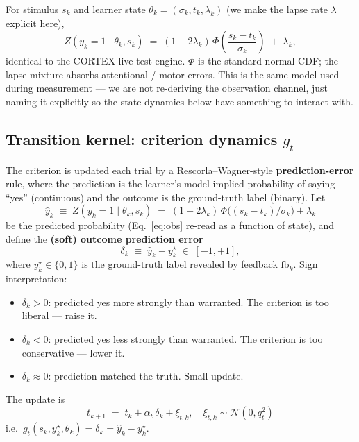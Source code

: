\documentclass[11pt]{article}
\begin{document}
For stimulus $s_k$ and learner state $\theta_k = (\sigma_k, t_k,
\lambda_k)$ (we make the lapse rate $\lambda$ explicit here),
\begin{equation}
  Z(y_k = 1 \mid \theta_k, s_k) \;=\;
    (1 - 2\lambda_k)\,\Phi\!\left(\frac{s_k - t_k}{\sigma_k}\right)
    \;+\; \lambda_k,
  \label{eq:obs}
\end{equation}
identical to the CORTEX live-test engine. $\Phi$ is the standard
normal CDF; the lapse mixture absorbs attentional / motor errors.
This is the same model used during measurement — we are not
re-deriving the observation channel, just naming it explicitly so the
state dynamics below have something to interact with.

\subsection{Transition kernel: criterion dynamics $g_t$}
\label{sec:gt}

The criterion is updated each trial by a Rescorla--Wagner-style
\textbf{prediction-error} rule, where the prediction is the learner's
model-implied probability of saying ``yes'' (continuous) and the
outcome is the ground-truth label (binary). Let
\begin{equation}
  \hat y_k \;\equiv\; Z(y_k = 1 \mid \theta_k, s_k)
  \;=\; (1 - 2\lambda_k)\,\Phi\!\bigl((s_k - t_k)/\sigma_k\bigr) + \lambda_k
  \label{eq:yhat}
\end{equation}
be the predicted probability (Eq.~\ref{eq:obs} re-read as a function
of state), and define the \textbf{(soft) outcome prediction error}
\begin{equation}
  \delta_k \;\equiv\; \hat y_k - y_k^{\star}
  \;\in\; [-1, +1],
  \label{eq:delta}
\end{equation}
where $y_k^{\star} \in \{0, 1\}$ is the ground-truth label revealed
by feedback $\mathrm{fb}_k$. Sign interpretation:
\begin{itemize}[leftmargin=*,itemsep=1pt]
  \item $\delta_k > 0$: predicted yes more strongly than warranted.
        The criterion is too liberal — raise it.
  \item $\delta_k < 0$: predicted yes less strongly than warranted.
        The criterion is too conservative — lower it.
  \item $\delta_k \approx 0$: prediction matched the truth. Small
        update.
\end{itemize}
The update is
\begin{equation}
  \boxed{\;
    t_{k+1} \;=\; t_k + \alpha_t\,\delta_k + \xi_{t,k},
    \quad \xi_{t,k} \sim \mathcal{N}(0, q_t^2)
  \;}
  \label{eq:tdyn}
\end{equation}
i.e.\ $g_t(s_k, y_k^{\star}, \theta_k) = \delta_k = \hat y_k -
y_k^{\star}$.
\end{document}
